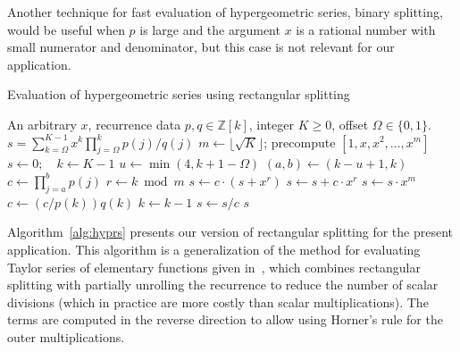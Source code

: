 \documentclass[11pt,a4paper]{article}
\begin{document}
Another technique for fast evaluation of hypergeometric series,
binary splitting, would be useful when $p$ is large and the
argument $x$ is a rational number with small numerator and denominator,
but this case is not relevant for our application.

\begin{algorithm}[h!]
  \caption{Evaluation of hypergeometric series using rectangular splitting}
  \small
  \label{alg:hyprs}
  \begin{algorithmic}[1]
    \Require An arbitrary $x$, recurrence data $p, q \in \mathbb{Z}[k]$, integer $K \ge 0$, offset $\Omega \in \{0,1\}$.
    \Ensure $s = \sum_{k=\Omega}^{K-1} x^k \prod_{j=\Omega}^k p(j) / q(j)$
    \State $m \gets \lfloor \sqrt K \rfloor$; precompute $[1, x, x^2, \ldots, x^m]$ 
    \State $s \gets 0; \quad k \gets K - 1$
        \State $u \gets \min(4, k + 1 - \Omega)$  
        \State $(a, b) \gets (k - u + 1, k)$  
        \State $c \gets \prod_{j=a}^b p(j)$ 
            \State $r \gets k \bmod m$
                \State $s \gets c \cdot (s + x^r)$ 
            \Else
                \State $s \gets s + c \cdot x^r$ 
            \EndIf
                \State $s \gets s \cdot x^m$ 
            \EndIf
            \State $c \gets (c / p(k)) q(k)$ 
            \State $k \gets k - 1$
        \EndWhile
        \State $s \gets s / c$
    \EndWhile
    \State \Return $s$
  \end{algorithmic}
\end{algorithm}

Algorithm \ref{alg:hyprs} presents our version of rectangular splitting
for the present application.
This algorithm is a generalization of the
method for evaluating Taylor series of elementary
functions given in~\cite{Johansson2015elementary},
which combines rectangular splitting
with partially unrolling the recurrence to reduce the number of scalar divisions
(which in practice are more costly than scalar multiplications).
The terms are computed in the reverse direction to allow
using Horner's rule for the outer
multiplications.
\end{document}
